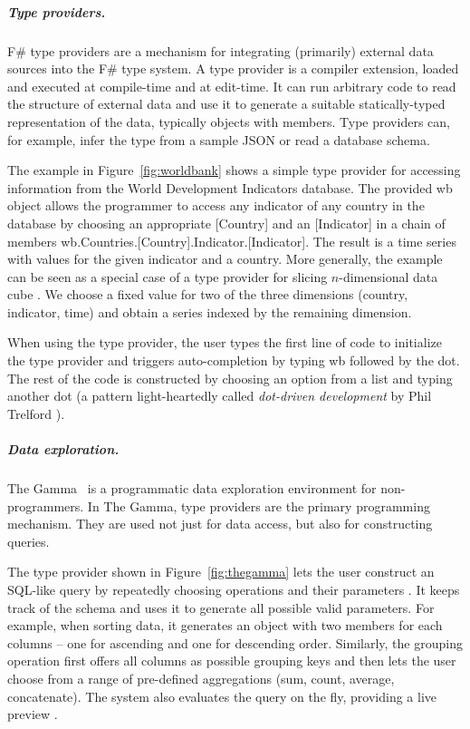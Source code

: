 \documentclass[ a4paper,UKenglish,cleveref, autoref, thm-restate]{lipics-v2021}
\newcommand{\ident}[1]{\textsf{#1}}
\begin{document}

\subparagraph{Type providers.}

F\# type providers \cite{syme-2013-inforich} are a mechanism for integrating (primarily) external data
sources into the F\# type system. A type provider is a compiler extension, loaded and
executed at compile-time and at edit-time. It can run arbitrary code to read the structure of
external data and use it to generate a suitable statically-typed representation of the
data, typically objects with members. Type providers can, for example, infer the type from a
sample JSON \cite{petricek-2016-fsdata} or read a database schema.

The example in Figure~\ref{fig:worldbank} shows a simple type provider for accessing information
from the World Development Indicators database. The provided \ident{wb} object allows the programmer
to access any indicator of any country in the database by choosing an appropriate \ident{[Country]}
and an \ident{[Indicator]} in a chain of members
\ident{wb}.\ident{Countries}.\ident{[Country]}.\ident{Indicator}.\ident{[Indicator]}.
The result is a time series with values for the given indicator and a country. More generally,
the example can be seen as a special case of a type provider for slicing $n$-dimensional
data cube \cite{petricek-2022-thegamma}. We choose a fixed value for two of the three
dimensions (country, indicator, time) and obtain a series indexed by the remaining dimension.

When using the type provider, the user types the first line of code to initialize the type provider
and triggers auto-completion by typing \ident{wb} followed by the dot. The rest of the code is
constructed by choosing an option from a list and typing another dot (a pattern light-heartedly
called \emph{dot-driven development} by Phil Trelford \cite{seemann-2021-head}).



\subparagraph{Data exploration.}

The Gamma~\cite{petricek-2022-thegamma} is a programmatic data exploration environment
for non-programmers. In The Gamma, type providers are the primary programming mechanism. They
are used not just for data access, but also for constructing queries.

The type provider shown in Figure~\ref{fig:thegamma} lets the user construct an SQL-like query by
repeatedly choosing operations and their parameters \cite{petricek-2017-dotdriven}. It keeps track
of the schema and uses it to generate all possible valid parameters. For example, when sorting data, it generates
an object with two members for each columns -- one for ascending and one for descending order.
Similarly, the grouping operation first offers all columns as possible grouping keys and then
lets the user choose from a range of pre-defined aggregations (sum, count, average, concatenate).
The system also evaluates the query on the fly, providing a live preview \cite{petricek-2020-live}.
\end{document}
